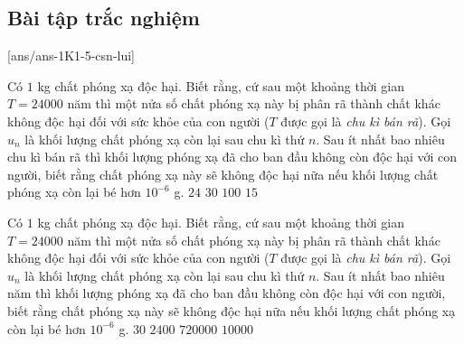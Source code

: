 \subsection*{Bài tập trắc nghiệm}
[ans/ans-1K1-5-csn-lui]
\begin{ex}%
	Có $1$ kg chất phóng xạ độc hại. Biết rằng, cứ sau một khoảng thời gian $T=24000$ năm thì một nửa số chất phóng xạ này bị phân rã thành chất khác không độc hại đối với sức khỏe của con người ($T$ được gọi là \textit{chu kì bán rã}). Gọi $u_n$ là khối lượng chất phóng xạ còn lại sau chu kì thứ $n$.
	Sau ít nhất bao nhiêu chu kì bán rã thì khối lượng phóng xạ đã cho ban đầu không còn độc hại với con người, biết rằng chất phóng xạ này sẽ không độc hại nữa nếu khối lượng chất phóng xạ còn lại bé hơn $10^{-6}$ g.
	\choice
	{$24$}
	{\True $30$}
	{$100$}
	{$15$}
\end{ex}
\begin{ex}%
	Có $1$ kg chất phóng xạ độc hại. Biết rằng, cứ sau một khoảng thời gian $T=24000$ năm thì một nửa số chất phóng xạ này bị phân rã thành chất khác không độc hại đối với sức khỏe của con người ($T$ được gọi là \textit{chu kì bán rã}). Gọi $u_n$ là khối lượng chất phóng xạ còn lại sau chu kì thứ $n$.
	Sau ít nhất bao nhiêu năm thì khối lượng phóng xạ đã cho ban đầu không còn độc hại với con người, biết rằng chất phóng xạ này sẽ không độc hại nữa nếu khối lượng chất phóng xạ còn lại bé hơn $10^{-6}$ g.
	\choice
	{$30$}
	{$2400$}
	{\True $720000$}
	{$10000$}
\end{ex}
